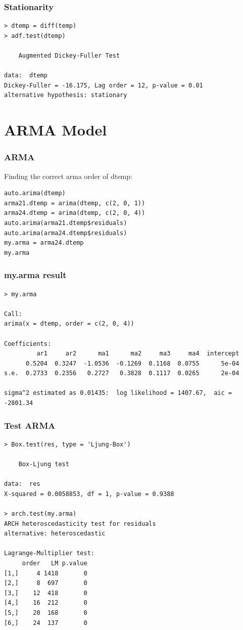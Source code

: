 \documentclass[9pt]{beamer}
\begin{document}
\begin{frame}[fragile]
\frametitle{Stationarity}
\begin{verbatim}
> dtemp = diff(temp)
> adf.test(dtemp)

	Augmented Dickey-Fuller Test

data:  dtemp
Dickey-Fuller = -16.175, Lag order = 12, p-value = 0.01
alternative hypothesis: stationary
\end{verbatim}
\end{frame}

\section{ARMA Model}

\begin{frame}[fragile]
\frametitle{ARMA}
Finding the correct arma order of dtemp:
\begin{verbatim}
auto.arima(dtemp)
arma21.dtemp = arima(dtemp, c(2, 0, 1))
arma24.dtemp = arima(dtemp, c(2, 0, 4))
auto.arima(arma21.dtemp$residuals)
auto.arima(arma24.dtemp$residuals)
my.arma = arma24.dtemp
my.arma
\end{verbatim}
\end{frame}

\begin{frame}[fragile]
\frametitle{my.arma result}
\begin{verbatim}
> my.arma

Call:
arima(x = dtemp, order = c(2, 0, 4))

Coefficients:
         ar1     ar2      ma1      ma2     ma3     ma4  intercept
      0.5204  0.3247  -1.0536  -0.1269  0.1168  0.0755      5e-04
s.e.  0.2733  0.2356   0.2727   0.3828  0.1117  0.0265      2e-04

sigma^2 estimated as 0.01435:  log likelihood = 1407.67,  aic = -2801.34
\end{verbatim}
\end{frame}

\begin{frame}[fragile]
\frametitle{Test ARMA}
\begin{verbatim}
> Box.test(res, type = 'Ljung-Box')

	Box-Ljung test

data:  res
X-squared = 0.0058853, df = 1, p-value = 0.9388

> arch.test(my.arma)
ARCH heteroscedasticity test for residuals 
alternative: heteroscedastic 

Lagrange-Multiplier test: 
     order   LM p.value
[1,]     4 1418       0
[2,]     8  697       0
[3,]    12  418       0
[4,]    16  212       0
[5,]    20  168       0
[6,]    24  137       0
\end{verbatim}
\end{frame}
\end{document}
